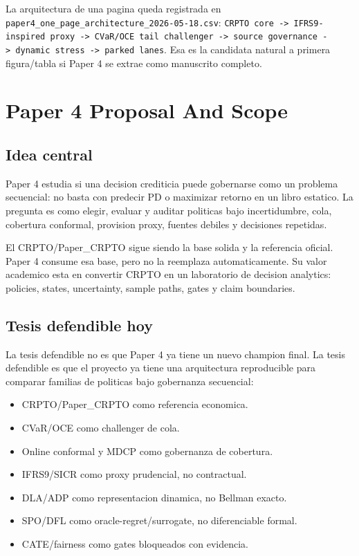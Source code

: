\documentclass[
  spanish,
  11pt,
  letterpaper,
]{scrbook}
\providecommand{\tightlist}{%
  \setlength{\itemsep}{0pt}\setlength{\parskip}{0pt}}
\theoremstyle{plain}
\theoremstyle{remark}
\begin{document}
La arquitectura de una pagina queda registrada en
\texttt{paper4\_one\_page\_architecture\_2026-05-18.csv}:
\texttt{CRPTO\ core\ -\textgreater{}\ IFRS9-inspired\ proxy\ -\textgreater{}\ CVaR/OCE\ tail\ challenger\ -\textgreater{}\ source\ governance\ -\textgreater{}\ dynamic\ stress\ -\textgreater{}\ parked\ lanes}.
Esa es la candidata natural a primera figura/tabla si Paper 4 se extrae
como manuscrito completo.

\chapter{Paper 4 Proposal And Scope}\label{paper-4-proposal-and-scope}

\section{Idea central}\label{idea-central}

Paper 4 estudia si una decision crediticia puede gobernarse como un
problema secuencial: no basta con predecir PD o maximizar retorno en un
libro estatico. La pregunta es como elegir, evaluar y auditar politicas
bajo incertidumbre, cola, cobertura conformal, provision proxy, fuentes
debiles y decisiones repetidas.

El CRPTO/Paper\_CRPTO sigue siendo la base solida y la referencia
oficial. Paper 4 consume esa base, pero no la reemplaza automaticamente.
Su valor academico esta en convertir CRPTO en un laboratorio de decision
analytics: policies, states, uncertainty, sample paths, gates y claim
boundaries.

\section{Tesis defendible hoy}\label{tesis-defendible-hoy}

La tesis defendible no es que Paper 4 ya tiene un nuevo champion final.
La tesis defendible es que el proyecto ya tiene una arquitectura
reproducible para comparar familias de politicas bajo gobernanza
secuencial:

\begin{itemize}
\tightlist
\item
  CRPTO/Paper\_CRPTO como referencia economica.
\item
  CVaR/OCE como challenger de cola.
\item
  Online conformal y MDCP como gobernanza de cobertura.
\item
  IFRS9/SICR como proxy prudencial, no contractual.
\item
  DLA/ADP como representacion dinamica, no Bellman exacto.
\item
  SPO/DFL como oracle-regret/surrogate, no diferenciable formal.
\item
  CATE/fairness como gates bloqueados con evidencia.
\end{itemize}
\end{document}
